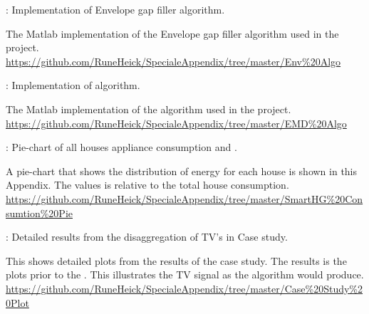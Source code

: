  : Implementation of Envelope gap filler algorithm.
\begin{adjustwidth}{2.5em}{0.0em}
The Matlab implementation of the Envelope gap filler algorithm used in the project.\\
\url{https://github.com/RuneHeick/SpecialeAppendix/tree/master/Env\%20Algo}
\end{adjustwidth}

 : Implementation of  algorithm.
\begin{adjustwidth}{2.5em}{0.0em}
The Matlab implementation of the  algorithm used in the project. \\
\url{https://github.com/RuneHeick/SpecialeAppendix/tree/master/EMD\%20Algo}
\end{adjustwidth}

 : Pie-chart of all houses appliance consumption and .
\begin{addmargin}[2.5em]{0.0em}
A pie-chart that shows the distribution of energy for each house is shown in this Appendix. The values is relative to the total house consumption.\\
\url{https://github.com/RuneHeick/SpecialeAppendix/tree/master/SmartHG\%20Consumtion\%20Pie}
\end{addmargin}

 : Detailed results from the disaggregation of TV's in Case study. 
\begin{adjustwidth}{2.5em}{0.0em}
This shows detailed plots from the results of the case study. The results is the plots prior to the . This illustrates the TV signal as the  algorithm would produce. \\
\url{https://github.com/RuneHeick/SpecialeAppendix/tree/master/Case\%20Study\%20Plot}
\end{adjustwidth}